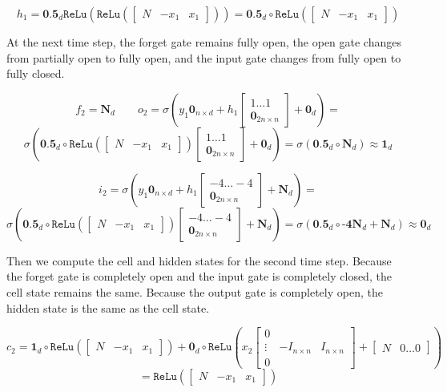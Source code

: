 \documentclass[12pt]{article}
\begin{document}
\[h_1 = \textbf{0.5}_d \texttt{ReLu} (\texttt{ReLu} ( \begin{bmatrix} N & -x_1 & x_1 \end{bmatrix})) = \textbf{0.5}_d\circ \texttt{ReLu} ( \begin{bmatrix} N & -x_1 & x_1 \end{bmatrix})\]

At the next time step, the forget gate remains fully open, the open gate changes from partially open to fully open, and the input gate changes from fully open to fully closed.

\[ f_2 = \textbf{N}_d \qquad  o_2 = \sigma(y_1\textbf{0}_{n\times d} + h_{1}\begin{bmatrix} 1 \dots 1 \\ \textbf{0}_{2n\times n} \end{bmatrix}  + \textbf{0}_d)  =\] \[ \sigma(\textbf{0.5}_d\circ \texttt{ReLu} ( \begin{bmatrix} N & -x_1 & x_1 \end{bmatrix})\begin{bmatrix} 1 \dots 1 \\ \textbf{0}_{2n\times n} \end{bmatrix}  + \textbf{0}_d)   =  \sigma(\textbf{0.5}_d\circ \textbf{N}_d) \approx \textbf{1}_d\]

\[ i_2 = \sigma(y_1\textbf{0}_{n\times d} + h_{1}\begin{bmatrix} -4 \dots -4 \\ \textbf{0}_{2n\times n} \end{bmatrix}  + \textbf{N}_d)  =\] \[ \sigma(\textbf{0.5}_d\circ \texttt{ReLu} ( \begin{bmatrix} N & -x_1 & x_1 \end{bmatrix})\begin{bmatrix} -4 \dots -4 \\ \textbf{0}_{2n\times n} \end{bmatrix}  + \textbf{N}_d)   =  \sigma(\textbf{0.5}_d\circ\textbf{-4N}_d + \textbf{N}_d) \approx \textbf{0}_d\]

Then we compute the cell and hidden states for the second time step. Because the forget gate is completely open and the input gate is completely closed, the cell state remains the same. Because the output gate is completely open, the hidden state is the same as the cell state.

\[ c_2 = \textbf{1}_d \circ \texttt{ReLu} ( \begin{bmatrix} N & -x_1 & x_1 \end{bmatrix}) + \textbf{0}_d\circ \texttt{ReLu} (x_2\begin{bmatrix} 0 &  & \\ \vdots & -I_{n \times n} & I_{n \times n}\\ 0 & &  \end{bmatrix} + \begin{bmatrix} N & 0 \dots 0\end{bmatrix}) \] \[= \texttt{ReLu} ( \begin{bmatrix} N & -x_1 & x_1 \end{bmatrix}) \]
\end{document}

